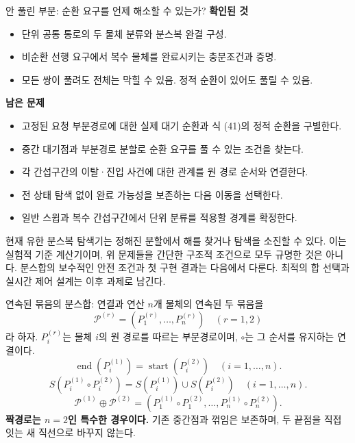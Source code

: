\begin{frame}{안 풀린 부분: 순환 요구를 언제 해소할 수 있는가?}
\small
\textbf{확인된 것}
\begin{itemize}
\item 단위 공통 통로의 두 물체 분류와 분스복 완결 구성.
\item 비순환 선행 요구에서 복수 물체를 완료시키는 충분조건과 증명.
\item 모든 쌍이 풀려도 전체는 막힐 수 있음. 정적 순환이 있어도 풀릴 수 있음.
\end{itemize}
\par\medskip
\textbf{남은 문제}
\begin{itemize}
\item 고정된 요청 부분경로에 대한 실제 대기 순환과 식 (41)의 정적 순환을 구별한다.
\item 중간 대기점과 부분경로 분할로 순환 요구를 풀 수 있는 조건을 찾는다.
\item 각 간섭구간의 이탈·진입 사건에 대한 관계를 원 경로 순서와 연결한다.
\item 전 상태 탐색 없이 완료 가능성을 보존하는 다음 이동을 선택한다.
\item 일반 스윕과 복수 간섭구간에서 단위 분류를 적용할 경계를 확정한다.
\end{itemize}
\par\medskip\footnotesize
현재 유한 분스복 탐색기는 정해진 분할에서 해를 찾거나 탐색을 소진할 수 있다.
이는 실험적 기준 계산기이며, 위 문제들을 간단한 구조적 조건으로 모두 규명한 것은 아니다.
분스합의 보수적인 안전 조건과 첫 구현 결과는 다음에서 다룬다.
최적의 합 선택과 실시간 제어 설계는 이후 과제로 남긴다.
\end{frame}


\begin{frame}{연속된 묶음의 분스합: 연결과 연산}
\small
$n$개 물체의 연속된 두 묶음을
\[
 \mathcal P^{(r)}=(P_1^{(r)},\ldots,P_n^{(r)})\quad(r=1,2)
\]
라 하자. $P_i^{(r)}$는 물체 $i$의 원 경로를 따르는 부분경로이며,
$\circ$는 그 순서를 유지하는 연결이다.
\begin{equation}
 \operatorname{end}(P_i^{(1)})=\operatorname{start}(P_i^{(2)})
 \quad(i=1,\ldots,n).
 \tag{43}\label{eq:merge-continuity}
\end{equation}
\begin{equation}
 S(P_i^{(1)}\circ P_i^{(2)})
 =S(P_i^{(1)})\cup S(P_i^{(2)})\quad(i=1,\ldots,n).
 \tag{44}\label{eq:merge-sweep-union}
\end{equation}
\begin{equation}
 \boxed{\mathcal P^{(1)}\oplus\mathcal P^{(2)}
 =(P_1^{(1)}\circ P_1^{(2)},\ldots,P_n^{(1)}\circ P_n^{(2)}).}
 \tag{45}\label{eq:pair-merge}
\end{equation}
\textbf{짝경로는 $n=2$인 특수한 경우이다.}
기존 중간점과 꺾임은 보존하며, 두 끝점을 직접 잇는 새 직선으로 바꾸지 않는다.
\end{frame}

